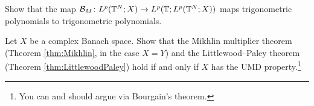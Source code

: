 \begin{exercise}\label{ex:B-trigpoly}
  Show that the map $\mathcal{B}_{M} \colon L^p(\mathbb{T}^{N};X) \to L^p(\mathbb{T};L^p(\mathbb{T}^{N};X))$ maps trigonometric polynomials to trigonometric polynomials.
\end{exercise}

\begin{exercise}
  Let $X$ be a complex Banach space.
  Show that the Mikhlin multiplier theorem (Theorem \ref{thm:Mikhlin}, in the case $X = Y$) and the Littlewood--Paley theorem (Theorem \ref{thm:LittlewoodPaley}) hold if and only if $X$ has the UMD property.\footnote{You can and should argue via Bourgain's theorem.}
\end{exercise}




